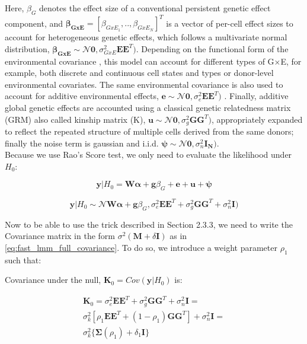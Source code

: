 Here, $\beta_G$ denotes the effect size of a conventional persistent genetic effect component, and $\boldsymbol{\beta_{GxE}}=[\beta_{GxE_1}, .. ,\beta_{GxE_N}]^T$ is a vector of per-cell effect sizes to account for heterogeneous genetic effects, which follows a multivariate normal distribution, $\boldsymbol{\beta_{GxE}} \sim \mathcal{N}\mathbf{0},\sigma_{GxE}^2 \mathbf{E}\mathbf{E}^T)$. 
Depending on the functional form of the environmental covariance , this model can account for different types of G×E, for example, both discrete and continuous cell states and types or donor-level environmental covariates. 
The same environmental covariance is also used to account for additive environmental effects, $\mathbf{e} \sim \mathcal{N}\mathbf{0},\sigma_e^2 \mathbf{E}\mathbf{E}^T)$ \cite{moore2019linear}. 
Finally, additive global genetic effects are accounted using a classical genetic relatedness matrix (GRM) \cite{purcell2007plink} also called kinship matrix (K), $\mathbf{u} \sim \mathcal{N}\mathbf{0},\sigma_g^2 \mathbf{G}\mathbf{G}^T)$, appropriately expanded to reflect the repeated structure of multiple cells derived from the same donors; finally the noise term is gaussian and i.i.d. $\boldsymbol{\psi} \sim \mathcal{N}\mathbf{0},\sigma_n^2 \mathbf{I_N})$.\\

Because we use Rao's Score test, we only need to evaluate the likelihood under $H_0$:

\begin{equation}\label{eq:scStructLMM_H0}
 \mathbf{y}|H_0 =  \mathbf{W}\boldsymbol{\alpha} + \mathbf{g}\beta_G + \mathbf{e} + \mathbf{u} + \boldsymbol{\psi} 
\end{equation}

\begin{equation}\label{eq:scStructLMM_H0_MVN}
 \mathbf{y}|H_0 \sim \mathcal{N} \mathbf{W}\boldsymbol{\alpha} + \mathbf{g}\beta_G, \sigma_e^2 \mathbf{E}\mathbf{E}^T + \sigma_g^2 \mathbf{G}\mathbf{G}^T+ \sigma_n^2 \mathbf{I} )
\end{equation}

Now to be able to use the trick described in Section 2.3.3, we need to write the Covariance matrix in the form $\sigma^2(\mathbf{M}+\delta\mathbf{I})$ as in \eqref{eq:fast_lmm_full_covariance}.
To do so, we introduce a weight parameter $\rho_1$ such that:

Covariance under the null, $\mathbf{K}_0 = Cov(\mathbf{y} | H_0)$ is:

\begin{equation}
\begin{split}
    \mathbf{K}_0 = \sigma_e^2 \mathbf{E}\mathbf{E}^T + \sigma_g^2 \mathbf{G}\mathbf{G}^T+ \sigma_n^2 \mathbf{I} =\\
    \sigma_k^2[\rho_1\mathbf{E}\mathbf{E}^T + (1-\rho_1) \mathbf{G}\mathbf{G}^T] + \sigma_n^2 \mathbf{I} =\\ \sigma_k^2\{\boldsymbol{\Sigma}(\rho_1) + \delta_1 \mathbf{I}\}
\end{split}
\end{equation}

